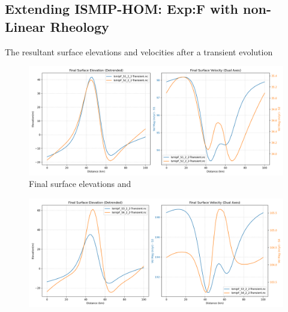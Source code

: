 \subsection{Extending ISMIP-HOM: Exp:F with non-Linear Rheology}


The resultant surface elevations and velocities after a transient evolution

\begin{figure}[H]
    \includegraphics[scale=0.45]{combined_elevation_detrended_surface_velocity_['S1']_['S2'].png}
    \caption{Final surface elevations and }
    \label{fig:elev_vel_S1_S2}
\end{figure}

\begin{figure}[H]
    \includegraphics[scale=0.45]{combined_elevation_detrended_surface_velocity_['S3']_['S4'].png}
    \caption{}
    \label{fig:elev_vel_S3_S4}
\end{figure}




